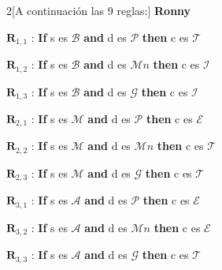 \documentclass[10pt,onecolumn,twoside,letterpaper]{article}
\begin{document}
\begin{multicols}{2}[A continuaci\'on las 9 reglas:]
\textbf{Ronny}\\
{\small
\par$\mathbf{R}_{1,1}$ : \textbf{If} s es $\mathcal{B}$ \textbf{and} d es $\mathcal{P}$ \textbf{then} c es $\mathcal{T}$\\
\par$\mathbf{R}_{1,2}$ : \textbf{If} s es $\mathcal{B}$ \textbf{and} d es $\mathcal{M}n$ \textbf{then} c es $\mathcal{I}$\\
\par$\mathbf{R}_{1,3}$ : \textbf{If} s es $\mathcal{B}$ \textbf{and} d es $\mathcal{G}$ \textbf{then} c es $\mathcal{I}$\\
\par$\mathbf{R}_{2,1}$ : \textbf{If} s es $\mathcal{M}$ \textbf{and} d es $\mathcal{P}$ \textbf{then} c es $\mathcal{E}$\\
\par$\mathbf{R}_{2,2}$ : \textbf{If} s es $\mathcal{M}$ \textbf{and} d es $\mathcal{M}n$ \textbf{then} c es $\mathcal{T}$\\
\par$\mathbf{R}_{2,3}$ : \textbf{If} s es $\mathcal{M}$ \textbf{and} d es $\mathcal{G}$ \textbf{then} c es $\mathcal{T}$\\
\par$\mathbf{R}_{3,1}$ : \textbf{If} s es $\mathcal{A}$ \textbf{and} d es $\mathcal{P}$ \textbf{then} c es $\mathcal{E}$\\
\par$\mathbf{R}_{3,2}$ : \textbf{If} s es $\mathcal{A}$ \textbf{and} d es $\mathcal{M}n$ \textbf{then} c es $\mathcal{E}$\\
\par$\mathbf{R}_{3,3}$ : \textbf{If} s es $\mathcal{A}$ \textbf{and} d es $\mathcal{G}$ \textbf{then} c es $\mathcal{T}$}\\


\end{multicols}
\end{document}
